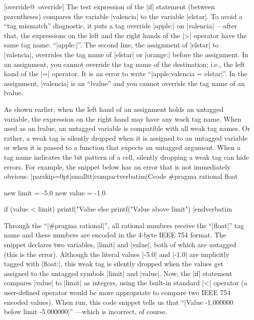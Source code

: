 [override@\midtilde\ override] 
The test expression of the |if| statement (between parentheses) compares the
variable |valencia| to the variable |elstar|. To avoid a ``tag mismatch''
diagnostic, it puts a tag override |apple:| on |valencia| ---after that, the
expressions on the left and the right hands of the |>| operator have the same
tag name: ``|apple:|''.
%
The second line, the assignment of |elstar| to |valencia|, overrides the tag
name of |elstar| or |orange:| before the assignment. In an assignment, you
cannot override the tag name of the destination; i.e., the left hand of the |=|
operator. It is an error to write ``|apple:valencia = elstar|''. In the
assignment, |valencia| is an ``lvalue'' and you cannot override the tag name of
an lvalue.

As shown earlier, when the left hand of an assignment holds an untagged variable,
the expression on the right hand may have any waek tag name. When used as an
lvalue, an untagged variable is compatible with all weak tag names. Or rather,
a weak tag is silently dropped when it is assigned to an untagged variable or
when it is passed to a function that expects an untagged argument. When a
tag name indicates the bit pattern of a cell, silently dropping a weak tag can
hide errors. For example, the snippet below has an error that is not immediately
obvious:
\listingx\verbatim|parskip=0pt|smalltt|compactverbatim|Ccode
#pragma rational float

new limit = -5.0
new value = -1.0

if (value < limit)
    printf("Value %
else
    printf("Value above limit\n")
|endverbatim\endlistingx

Through the ``|#pragma rational|'', all rational numbers receive the ``|float|''
tag name and these numbers are encoded in the 4-byte IEEE 754 format. The
snippet declares two variables, |limit| and |value|, both of which are
{\it un\/}tagged (this is the error). Although the literal values |-5.0| and
|-1.0| are implicitly tagged with |float:|, this weak tag is silently
dropped when the values get assigned to the untagged symbols |limit| and |value|.
Now, the |if| statement compares |value| to |limit| as integers, using the
built-in standard |<| operator (a user-defined operator would be more
appropriate to compare two IEEE 754 encoded values). When run, this code snippet
tells us that ``|Value -1.000000 below limit -5.000000|'' ---which is incorrect,
of course.

